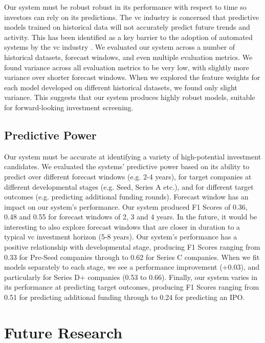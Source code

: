 \documentclass[../thesis/thesis.tex]{subfiles}
\begin{document}
Our system must be robust robust in its performance with respect to time so investors can rely on its predictions. The \gls{vc} industry is concerned that predictive models trained on historical data will not accurately predict future trends and activity. This has been identified as a key barrier to the adoption of automated systems by the \gls{vc} industry \cite{stone2014}. We evaluated our system across a number of historical datasets, forecast windows, and even multiple evaluation metrics. We found variance across all evaluation metrics to be very low, with slightly more variance over shorter forecast windows. When we explored the feature weights for each model developed on different historical datasets, we found only slight variance. This suggests that our system produces highly robust models, suitable for forward-looking investment screening.

\subsection{Predictive Power}

Our system must be accurate at identifying a variety of high-potential investment candidates. We evaluated the systems' predictive power based on its ability to predict over different forecast windows (e.g. 2-4 years), for target companies at different developmental stages (e.g. Seed, Series A etc.), and for different target outcomes (e.g. predicting additional funding rounds). Forecast window has an impact on our system's performance. Our system produced F1 Scores of 0.36, 0.48 and 0.55 for forecast windows of 2, 3 and 4 years. In the future, it would be interesting to also explore forecast windows that are closer in duration to a typical \gls{vc} investment horizon (5-8 years). Our system's performance has a positive relationship with developmental stage, producing F1 Scores ranging from 0.33 for Pre-Seed companies through to 0.62 for Series C companies. When we fit models separately to each stage, we see a performance improvement (+0.03), and particularly for Series D+ companies (0.53 to 0.66). Finally, our system varies in its performance at predicting target outcomes, producing F1 Scores ranging from 0.51 for predicting additional funding through to 0.24 for predicting an IPO.

\section{Future Research} %
\end{document}

